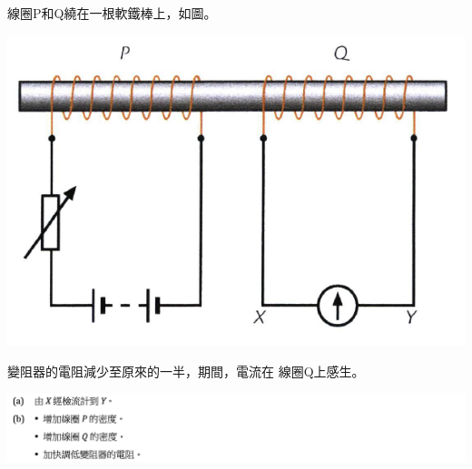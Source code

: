 {
    線圈P和Q繞在一根軟鐵棒上，如圖。
    \par{\par\centering\includegraphics[width=.35\textwidth]{./img/ch5_induction_lq_2024-06-24-17-30-54.png}\par}
    變阻器的電阻減少至原來的一半，期間，電流在 線圈Q上感生。
}{\par{\par\centering\includegraphics[width=\textwidth]{./img/ch5_induction_lq_2024-06-24-17-37-25.png}\par}}

